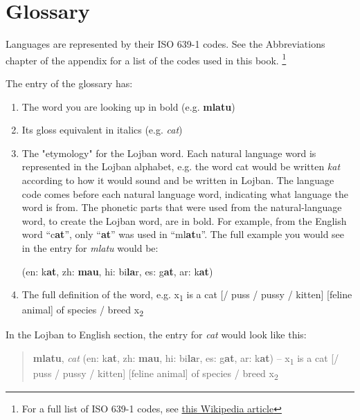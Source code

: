 \documentclass[12pt]{book}
\begin{document}

\mainmatter






\appendix

\chapter{Glossary}

Languages are represented by their ISO 639-1 codes. See the Abbreviations chapter of the appendix for a list of the codes used in this book. \footnote{For a full list of ISO 639-1 codes, see \href{https://en.wikipedia.org/wiki/List_of_ISO_639-1_codes}{this Wikipedia article}}

The entry of the glossary has:

\begin{enumerate}
\item The word you are looking up in bold (e.g. \textbf{mlatu})
\item Its gloss equivalent in italics (e.g. \textit{cat}) 
\item The "etymology" for the Lojban word. Each natural language word is represented in the Lojban alphabet, e.g. the word cat would be written \emph{kat} according to how it would sound and be written in Lojban. The language code comes before each natural language word, indicating what language the word is from. The phonetic parts that were used from the natural-language word, to create the Lojban word, are in bold. For example, from the English word ``c\textbf{at}'', only ``\textbf{at}'' was used in ``ml\textbf{at}u''. The full example you would see in the entry for \emph{mlatu} would be: 

(en: k\textbf{at}, zh: \textbf{mau}, hi: bi\textbf{la}r, es: g\textbf{at}, ar: k\textbf{at})
\item The full definition of the word, e.g. x\textsubscript{1} is a cat [/ puss / pussy / kitten] [feline animal] of species / breed x\textsubscript{2}
\end{enumerate}


In the Lojban to English section, the entry for \emph{cat} would look like this:


\begin{quote}
\textbf{mlatu}, \textit{cat} (en: k\textbf{at}, zh: \textbf{mau}, hi: bi\textbf{la}r, es: g\textbf{at}, ar: k\textbf{at}) -- x\textsubscript{1} is a cat [/ puss / pussy / kitten] [feline animal] of species / breed x\textsubscript{2}
\end{quote}
\end{document}
